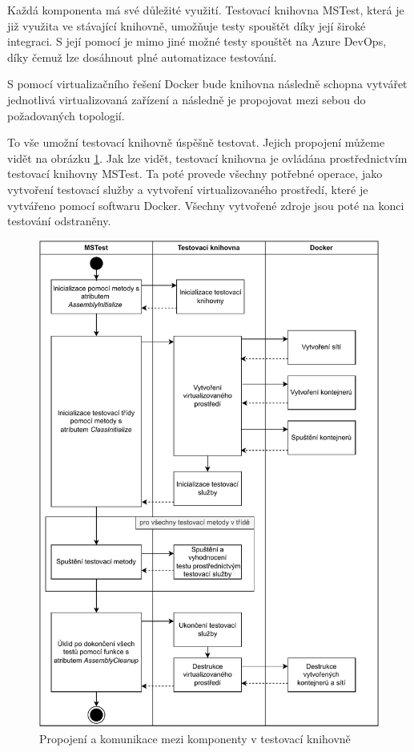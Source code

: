 Každá komponenta má své důležité využití. Testovací knihovna MSTest, která je již využita ve stávající knihovně, umožňuje testy spouštět díky její široké integraci. S její pomocí je mimo jiné možné testy spouštět na Azure DevOps, díky čemuž lze dosáhnout plné automatizace testování.

S pomocí virtualizačního řešení Docker bude knihovna následně schopna vytvářet jednotlivá virtualizovaná zařízení a následně je propojovat mezi sebou do požadovaných topologií. 

To vše umožní testovací knihovně úspěšně testovat. Jejich propojení můžeme vidět na obrázku \ref{fig:run_stack}. Jak lze vidět, testovací knihovna je ovládána prostřednictvím testovací knihovny MSTest. Ta poté provede všechny potřebné operace, jako vytvoření testovací služby a vytvoření virtualizovaného prostředí, které je vytvářeno pomocí softwaru Docker. Všechny vytvořené zdroje jsou poté na konci testování odstraněny.  

\begin{figure}[htbp]
    \centering 
    \includegraphics[width=\textwidth]{assets/img/run_stack.pdf}
    \caption{Propojení a komunikace mezi komponenty v testovací knihovně}
    \label{fig:run_stack}
\end{figure}

